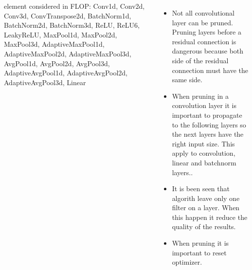 \documentclass[25pt, a0paper,
               colspace=15mm, subcolspace=0mm,
               blockverticalspace=17mm,
               landscape]{tikzposter} %
\begin{document}
\begin{columns}
{{\tiny element considered in FLOP: Conv1d, Conv2d, Conv3d, ConvTranspose2d, BatchNorm1d, BatchNorm2d, BatchNorm3d, ReLU, ReLU6, LeakyReLU, MaxPool1d, MaxPool2d, MaxPool3d, AdaptiveMaxPool1d, AdaptiveMaxPool2d, AdaptiveMaxPool3d, AvgPool1d, AvgPool2d, AvgPool3d, AdaptiveAvgPool1d, AdaptiveAvgPool2d, AdaptiveAvgPool3d, Linear}
  
  }


  {
  	\begin{itemize}
   \item Not all convolutional layer can be pruned. Pruning layers before a residual connection is dangerous because both side of the residual connection must have the same side.
  \item When pruning in a convolution layer it is important to propagate to the following layers so the next layers have the right input size. This apply to convolution, linear and batchnorm layers..
  \item It is been seen that algorith leave only one filter on a layer. When this happen it reduce the quality of the results.
  \item When pruning it is important to reset optimizer.
  \end{itemize}
\vspace{0.5cm}
  }

\end{columns}
\end{document}
